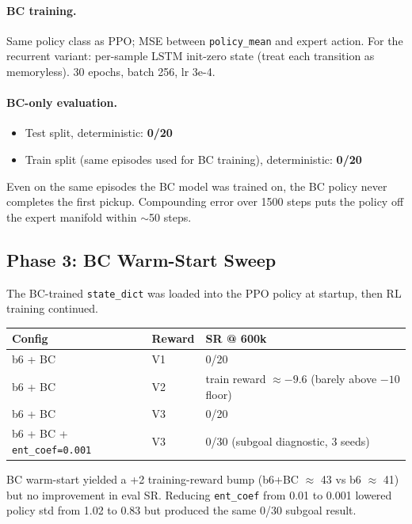 \documentclass[11pt,letterpaper]{article}
\begin{document}
\paragraph{BC training.}
Same policy class as PPO; MSE between \texttt{policy\_mean} and expert action.
For the recurrent variant: per-sample LSTM init-zero state (treat each
transition as memoryless). 30 epochs, batch 256, lr 3e-4.

\paragraph{BC-only evaluation.}
\begin{itemize}[nosep]
  \item Test split, deterministic: \textbf{0/20}
  \item Train split (same episodes used for BC training), deterministic:
        \textbf{0/20}
\end{itemize}

Even on the same episodes the BC model was trained on, the BC policy never
completes the first pickup. Compounding error over 1500 steps puts the policy
off the expert manifold within $\sim$50 steps.

\subsection{Phase 3: BC Warm-Start Sweep}

The BC-trained \texttt{state\_dict} was loaded into the PPO policy at startup,
then RL training continued.

\begin{table}[H]
\centering
\begin{tabular}{lll}
\toprule
\textbf{Config} & \textbf{Reward} & \textbf{SR @ 600k} \\
\midrule
b6 + BC & V1 & 0/20 \\
b6 + BC & V2 & train reward $\approx -9.6$ (barely above $-10$ floor) \\
b6 + BC & V3 & 0/20 \\
b6 + BC + \texttt{ent\_coef=0.001} & V3 & 0/30 (subgoal diagnostic, 3 seeds) \\
\bottomrule
\end{tabular}
\end{table}

BC warm-start yielded a +2 training-reward bump (b6+BC $\approx$ 43 vs b6 $\approx$ 41)
but no improvement in eval SR. Reducing \texttt{ent\_coef} from 0.01 to 0.001
lowered policy std from 1.02 to 0.83 but produced the same 0/30 subgoal result.
\end{document}
